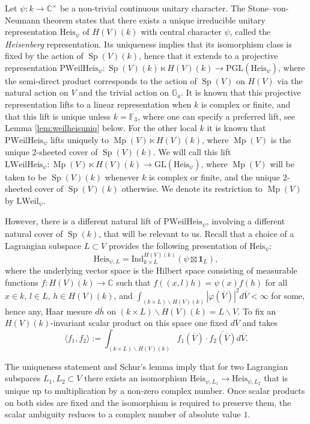 \documentclass{article}
\def\mb#1{\mathbb{#1}}
\def\tx#1{\textrm{#1}}
\def\C{\mathbb{C}}
\def\F{\mathbb{F}}
\def\lmod{\backslash}
\def\ol#1{\overline{#1}}
\def\<{\langle}
\def\>{\rangle}
\DeclareMathOperator{\Sp}{Sp}
\theoremstyle{definition}
\numberwithin{equation}{subsection}
\renewcommand{\-}{\hyp{}}
\DeclareMathOperator{\Mp}{Mp}
\begin{document}
\begin{appendices}
Let $\psi : k \to \C^\times$ be a non-trivial continuous unitary character. The Stone--von-Neumann theorem states that there exists a unique irreducible unitary representation $\tx{Heis}_\psi$ of $H(V)(k)$ with central character $\psi$, called the \emph{Heisenberg} representation. Its uniqueness implies that its isomorphism class is fixed by the action of $\Sp(V)(k)$, hence that it extends to a projective representation $\mathrm{PWeilHeis}_\psi : \Sp(V)(k) \ltimes H(V)(k) \to \tx{PGL}(\tx{Heis}_\psi)$, where the semi-direct product corresponds to the action of $\Sp(V)$ on $H(V)$ via the natural action on $V$ and the trivial action on $\mb{G}_a$. It is known that this projective representation lifts to a linear representation  when $k$ is complex or finite, and that this lift is unique unless $k=\F_3$, where one can specify a preferred lift, see Lemma \ref{lem:weilheisuniq} below. For the other local $k$ it is known that $\mathrm{PWeilHeis}_\psi$ lifts uniquely to $\Mp(V) \ltimes H(V)(k)$, where $\Mp(V)$ is the unique 2-sheeted cover of $\Sp(V)(k)$. We will call this lift $\mathrm{LWeilHeis}_\psi : \Mp(V) \ltimes  H(V)(k) \to \tx{GL}(\tx{Heis}_\psi)$, where $\Mp(V)$ will be taken to be $\Sp(V)(k)$ whenever $k$ is complex or finite, and the unique $2$-sheeted cover of $\Sp(V)(k)$ otherwise. We denote its restriction to $\Mp(V)$ by $\mathrm{LWeil}_\psi$.

However, there is a different natural lift of $\mathrm{PWeilHeis}_\psi$, involving a different natural cover of $\Sp(k)$, that will be relevant to us. Recall that a choice of a Lagrangian subspace $L \subset V$ provides the following presentation of $\tx{Heis}_\psi$:
\[ \tx{Heis}_{\psi,L} = \tx{Ind}_{k \times L}^{H(V)(k)}(\psi \boxtimes \mathbf{1}_{L}), \]
where the underlying vector space is the Hilbert space consisting of measurable functions $f : H(V)(k) \to \C$ such that $f((x,l)h)=\psi(x)f(h)$ for all $x \in k$, $l \in L$, $h \in H(V)(k)$, and $\int_{(k \times L) \lmod H(V)(k)}|\varphi(\ol{V})|^2d\ol{V} < \infty$ for some, hence any, Haar mesure $d\bar h$ on $(k \times L) \lmod H(V)(k) = L \lmod V$. To fix an $H(V)(k)$-invariant scalar product on this space one fixed $d\ol{V}$ and takes
\[ \<f_1,f_2\> := \int_{(k \times L) \lmod H(V)(k)} f_1(\ol{V})\cdot \ol{f_2(\ol{V})}d\ol{V}. \]

The uniqueness statement and Schur's lemma imply that for two Lagrangian subspaces $L_1,L_2 \subset V$ there exists an isomorphism $\tx{Heis}_{\psi,L_1} \to \tx{Heis}_{\psi,L_2}$ that is unique up to multiplication by a non-zero complex number. Once scalar products on both sides are fixed and the isomorphism is required to preserve them, the scalar ambiguity reduces to a complex number of absolute value $1$. 


\end{appendices}
\end{document}
